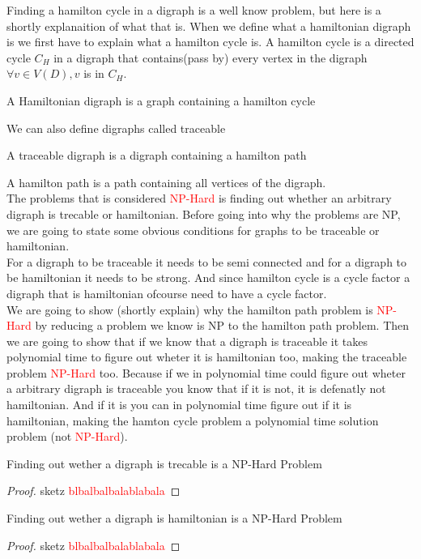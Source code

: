 Finding a hamilton cycle in a digraph is a well know problem, but here is a shortly explanaition of what that is.
When we define what a hamiltonian digraph is we first have to explain what a hamilton cycle is. 
A hamilton cycle is a directed cycle $C_H$ in a digraph that contains(pass by) every vertex in the digraph $\forall v\in V(D), v$ is in $C_H$.\\
\begin{definition}
    A Hamiltonian digraph is a graph containing a hamilton cycle 
\end{definition} 
We can also define digraphs called traceable
\begin{definition}
    A traceable digraph is a digraph containing a hamilton path
\end{definition}
A hamilton path is a path containing all vertices of the digraph.\\
The problems that is considered \textcolor{red}{NP-Hard} is finding out whether an arbitrary digraph is trecable or hamiltonian.
Before going into why the problems are NP, we are going to state some obvious conditions for graphs to be traceable or hamiltonian. \\
For a digraph to be traceable it needs to be semi connected and for a digraph to be hamiltonian it needs to be strong. And since hamilton cycle is a cycle factor a digraph that is hamiltonian ofcourse need to have a cycle factor.\\
We are going to show (shortly explain) why the hamilton path problem is \textcolor{red}{NP-Hard} by reducing a problem we know is NP to the hamilton path problem.
Then we are going to show that if we know that a digraph is traceable it takes polynomial time to figure out wheter it is hamiltonian too, making the traceable problem \textcolor{red}{NP-Hard} too.
Because if we in polynomial time could figure out wheter a arbitrary digraph is traceable you know that if it is not, it is defenatly not hamiltonian. 
And if it is you can in polynomial time figure out if it is hamiltonian, making the hamton cycle problem a polynomial time solution problem (not \textcolor{red}{NP-Hard}).
\begin{thm}
    Finding out wether a digraph is trecable is a NP-Hard Problem
\end{thm}
\begin{proof}
    sketz \textcolor{red}{blbalbalbalablabala}
\end{proof}

\begin{thm}
    Finding out wether a digraph is hamiltonian is a NP-Hard Problem
\end{thm}
\begin{proof}
    sketz \textcolor{red}{blbalbalbalablabala}
\end{proof}